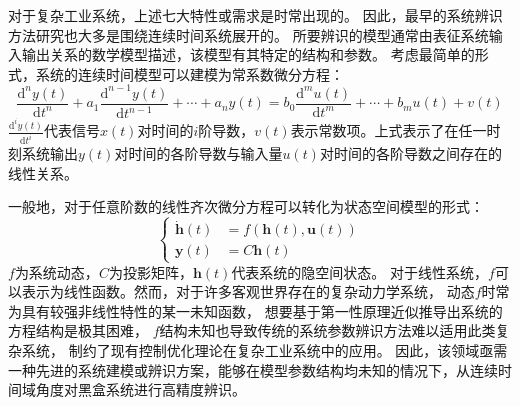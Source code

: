 对于复杂工业系统，上述七大特性或需求是时常出现的。
因此，最早的系统辨识方法研究也大多是围绕连续时间系统展开的。
所要辨识的模型通常由表征系统输入输出关系的数学模型描述，该模型有其特定的结构和参数。
考虑最简单的形式，系统的连续时间模型可以建模为常系数微分方程：
\begin{equation}
\frac{\mathrm{d}^{n} y(t)}{\mathrm{d} t^{n}}+a_{1} \frac{\mathrm{d}^{n-1} y(t)}{\mathrm{d} t^{n-1}}+\cdots+a_{n} y(t)=b_{0} \frac{\mathrm{d}^{m} u(t)}{\mathrm{d} t^{m}}+\cdots+b_{m} u(t)+v(t)
\label{equ:linear_ct_dyn}
\end{equation}
$\frac{\mathrm d^{i} y(t)}{\mathrm d t^{i}}$代表信号$x(t)$对时间的$i$阶导数，$v(t)$表示常数项。上式表示了在任一时刻系统输出$y(t)$对时间的各阶导数与输入量$u(t)$对时间的各阶导数之间存在的线性关系。

一般地，对于任意阶数的线性齐次微分方程可以转化为状态空间模型的形式：
\begin{equation}
    \left\{
    \begin{aligned}
\dot {\boldsymbol h}(t)&=f(\boldsymbol h(t), \boldsymbol{u}(t))\\
\boldsymbol y(t)&= C \boldsymbol h(t)
    \end{aligned}
    \right.
\end{equation}
$f$为系统动态，$C$为投影矩阵，$\boldsymbol h(t)$代表系统的隐空间状态。
对于线性系统，$f$可以表示为线性函数。然而，对于许多客观世界存在的复杂动力学系统，
动态$f$时常为具有较强非线性特性的某一未知函数，
想要基于第一性原理近似推导出系统的方程结构是极其困难，
$f$结构未知也导致传统的系统参数辨识方法难以适用此类复杂系统，
制约了现有控制优化理论在复杂工业系统中的应用。
因此，该领域亟需一种先进的系统建模或辨识方案，能够在模型参数结构均未知的情况下，从连续时间域角度对黑盒系统进行高精度辨识。

